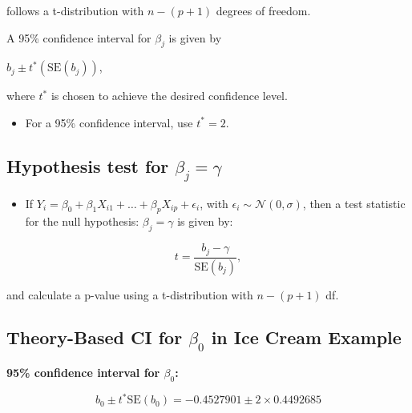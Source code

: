 \documentclass[]{book}
\newenvironment{Shaded}{\begin{snugshade}}{\end{snugshade}}
\newcommand{\KeywordTok}[1]{\textcolor[rgb]{0.13,0.29,0.53}{\textbf{#1}}}
\newcommand{\DecValTok}[1]{\textcolor[rgb]{0.00,0.00,0.81}{#1}}
\newcommand{\StringTok}[1]{\textcolor[rgb]{0.31,0.60,0.02}{#1}}
\newcommand{\OperatorTok}[1]{\textcolor[rgb]{0.81,0.36,0.00}{\textbf{#1}}}
\newcommand{\NormalTok}[1]{#1}
\providecommand{\tightlist}{%
  \setlength{\itemsep}{0pt}\setlength{\parskip}{0pt}}
\begin{document}
follows a t-distribution with \(n-(p+1)\) degrees of freedom.

A 95\% confidence interval for \(\beta_j\) is given by

\(b_j \pm t^*\left({\text{SE}(b_j)}\right)\),

where \(t^*\) is chosen to achieve the desired confidence level.

\begin{itemize}
\tightlist
\item
  For a 95\% confidence interval, use \(t^*=2\).
\end{itemize}

\subsection{\texorpdfstring{Hypothesis test for
\(\beta_j=\gamma\)}{Hypothesis test for \textbackslash{}beta\_j=\textbackslash{}gamma}}\label{hypothesis-test-for-beta_jgamma}

\begin{itemize}
\tightlist
\item
  If
  \(Y_i = \beta_0 + \beta_1X_{i1}+ \ldots + \beta_pX_{ip} + \epsilon_i\),
  with \(\epsilon_i\sim\mathcal{N}(0,\sigma)\), then a test statistic
  for the null hypothesis: \(\beta_j = \gamma\) is given by:
\end{itemize}

\[
t=\frac{{b_j}-\gamma}{\text{SE}(b_j)}, 
\]

and calculate a p-value using a t-distribution with \(n-(p+1)\) df.

\subsection{\texorpdfstring{Theory-Based CI for \(\beta_0\) in Ice Cream
Example}{Theory-Based CI for \textbackslash{}beta\_0 in Ice Cream Example}}\label{theory-based-ci-for-beta_0-in-ice-cream-example}

\textbf{95\% confidence interval for \(\beta_0\):}

\[
b_0\pm t^*\text{SE}(b_0) = -0.4527901 \pm 2 \times 0.4492685
\]

\begin{Shaded}
\end{Shaded}
\end{document}
